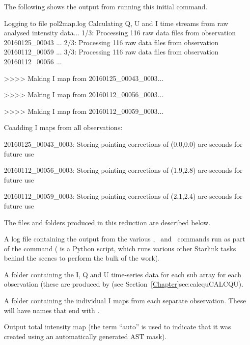 The following shows the output from running this initial 
command.

\begin{terminalv}
Logging to file pol2map.log
Calculating Q, U and I time streams from raw analysed intensity data...
   1/3: Processing 116 raw data files from observation 20160125_00043 ...
   2/3: Processing 116 raw data files from observation 20160112_00059 ...
   3/3: Processing 116 raw data files from observation 20160112_00056 ...

>>>>   Making I map from 20160125_00043_0003...

>>>>   Making I map from 20160112_00056_0003...

>>>>   Making I map from 20160112_00059_0003...

Coadding I maps from all observations:

20160125_00043_0003: Storing pointing corrections of (0.0,0.0) arc-seconds
for future use

20160112_00056_0003: Storing pointing corrections of (1.9,2.8) arc-seconds
for future use

20160112_00059_0003: Storing pointing corrections of (2.1,2.4) arc-seconds
for future use

\end{terminalv}

The files and folders produced in this reduction are described below.

\begin{aligndesc}
\item[\file{pol2map.log}] A log file containing the output from the
  various \SMURF, \KAPPA\ and \POLPACK\ commands run as part of the 
  command ( is a Python script, which runs various other
  Starlink tasks behind the scenes to perform the bulk of the work).

\item[\file{qudata/}] A folder containing the I, Q and U time-series data
  for each sub array for each observation (these are produced by
   (see Section~\cref{Chapter}{sec:calcqu}{CALCQU}).

\item[\file{maps/}] A folder containing the individual I maps from
  each separate observation. These will have names that end with
  .

\item[\file{iauto.sdf}] Output total intensity map (the term ``auto'' is
used to indicate that it was created using an automatically generated
AST mask).

\end{aligndesc}

